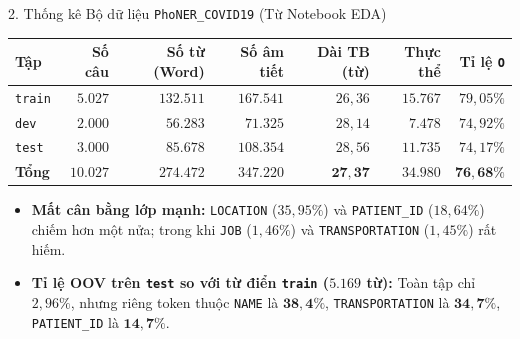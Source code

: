 \documentclass[aspectratio=169,10pt]{beamer}
\begin{document}
\begin{frame}{2. Thống kê Bộ dữ liệu \texttt{PhoNER\_COVID19} (Từ Notebook EDA)}
  \begin{table}
    \centering
    \footnotesize
    \begin{tabular}{lrrrrrr}
      \toprule
      \textbf{Tập} & \textbf{Số câu} & \textbf{Số từ (Word)} & \textbf{Số âm tiết} & \textbf{Dài TB (từ)} & \textbf{Thực thể} & \textbf{Tỉ lệ \texttt{O}} \\
      \midrule
      \texttt{train} & $5.027$ & $132.511$ & $167.541$ & $26{,}36$ & $15.767$ & $79{,}05\%$ \\
      \texttt{dev}   & $2.000$ & $56.283$  & $71.325$  & $28{,}14$ & $7.478$  & $74{,}92\%$ \\
      \texttt{test}  & $3.000$ & $85.678$  & $108.354$ & $28{,}56$ & $11.735$ & $74{,}17\%$ \\
      \midrule
      \textbf{Tổng}  & $\mathbf{10.027}$ & $\mathbf{274.472}$ & $\mathbf{347.220}$ & $\mathbf{27{,}37}$ & $\mathbf{34.980}$ & $\mathbf{76{,}68\%}$ \\
      \bottomrule
    \end{tabular}
  \end{table}
  \begin{itemize}
    \item \textbf{Mất cân bằng lớp mạnh:} \texttt{LOCATION} ($35{,}95\%$) và \texttt{PATIENT\_ID} ($18{,}64\%$) chiếm hơn một nửa; trong khi \texttt{JOB} ($1{,}46\%$) và \texttt{TRANSPORTATION} ($1{,}45\%$) rất hiếm.
    \item \textbf{Tỉ lệ OOV trên \texttt{test} so với từ điển \texttt{train} ($5.169$ từ):} Toàn tập chỉ $2{,}96\%$, nhưng riêng token thuộc \texttt{NAME} là $\mathbf{38{,}4\%}$, \texttt{TRANSPORTATION} là $\mathbf{34{,}7\%}$, \texttt{PATIENT\_ID} là $\mathbf{14{,}7\%}$.
  \end{itemize}
\end{frame}
\end{document}
